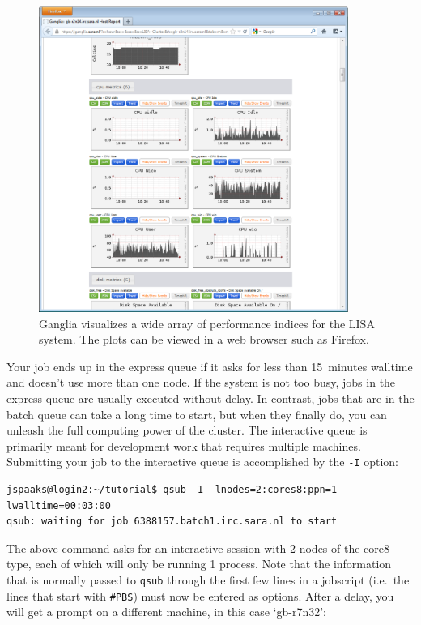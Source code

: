 \begin{figure}[hbt]
  \centering
    \includegraphics[width=0.9\textwidth]{./../eps/ganglia-screenshot.eps}
  \caption{Ganglia visualizes a wide array of performance indices for the LISA system. The plots can be viewed in a web browser such as Firefox.}
  \label{fig:ganglia-screenshot}
\end{figure}


Your job ends up in the express queue if it asks for less than 15~minutes walltime and doesn't use more than one node. If the system is not too busy, jobs in the express queue are usually executed without delay. In contrast, jobs that are in the batch queue can take a long time to start, but when they finally do, you can unleash the full computing power of the cluster. The interactive queue is primarily meant for development work that requires multiple machines. Submitting your job to the interactive queue is accomplished by the \lstinline[style=bashinline]{-I} option:
\begin{lstlisting}[style=basic,style=bash]
jspaaks@login2:~/tutorial$ qsub -I -lnodes=2:cores8:ppn=1 -lwalltime=00:03:00
qsub: waiting for job 6388157.batch1.irc.sara.nl to start
\end{lstlisting}
The above command asks for an interactive session with 2 nodes of the core8 type, each of which will only be running 1 process. Note that the information that is normally passed to \lstinline[style=bashinline]{qsub} through the first few lines in a jobscript (i.e.~the lines that start with \texttt{\#PBS}) must now be entered as options. After a delay, you will get a prompt on a different machine, in this case `gb-r7n32':

